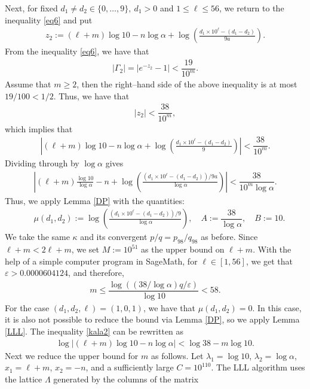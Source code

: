 \documentclass[10pt,a4paper]{article}
\begin{document}
\noindent
Next, for fixed $ d_1\neq d_2\in\{0, \ldots, 9\}, ~d_1>0 $ and $ 1\le \ell\le 56 $, we return to the inequality \eqref{eq6} and put
\begin{align*}
z_2:=(\ell+m)\log 10 - n\log\alpha +\log\left(\frac{d_1\times 10^{\ell}-(d_1-d_2)}{9a}\right).
\end{align*}
From the inequality \eqref{eq6}, we have that
\begin{align*}
|\Gamma_2| = \left|e^{-z_2}-1\right|< \dfrac{19}{10^{m}}.
\end{align*}
Assume that $ m\ge 2 $, then the right--hand side of the above inequality is at most $ 19/100 < 1/2 $. Thus, we have that
\begin{align*}
|z_2|<  \dfrac{38}{10^{m}},
\end{align*}
which implies that
\begin{align}\label{kala2}
\left|(\ell+m)\log 10 - n\log\alpha +\log\left(\frac{d_1\times 10^{\ell}-(d_1-d_2)}{9}\right)\right| <  \dfrac{38}{10^{m}}.
\end{align}
Dividing through by $ \log\alpha $ gives
\begin{align*}
\left|(\ell+m)\frac{\log 10}{\log\alpha} - n +\log\left(\frac{(d_1\times 10^{\ell}-(d_1-d_2))/9a}{\log\alpha}\right)\right| <  \dfrac{38}{10^{m}\log\alpha}.
\end{align*}
Thus, we apply Lemma \ref{DP} with the quantities:
\begin{align*}
 \quad \mu(d_1,d_2):=\log\left(\frac{(d_1\times 10^{\ell}-(d_1-d_2))/9}{\log\alpha}\right), \quad A:=\dfrac{38}{\log\alpha}, \quad B:=10.
\end{align*}
We take the same $ \kappa $ and its convergent $ p/q =p_{98}/q_{98} $ as before. Since $ \ell+m < 2\ell+m $, we set $M :=10^{51} $ as the upper bound on $ \ell+m $. With the help of a simple computer program in SageMath, for $ \ell\in [1,56] $,  we get that $ \varepsilon >0.0000604124 $, and therefore,
\begin{align*}
m\le \dfrac{\log((38/\log\alpha)q/\varepsilon)}{\log 10}<58.
\end{align*}
For the case $ (d_1, d_2, \ell)=(1,0,1) $, we have that $ \mu(d_1,d_2)=0 $. In this case, it is also not possible to reduce the bound via Lemma \ref{DP}, so we apply Lemma \ref{LLL}. The inequality \eqref{kala2} can be rewritten as
\begin{align}\label{kala3}
\log \left|(\ell+m)\log 10 - n\log\alpha \right| <  \log 38 - m\log 10.
\end{align}
Next we reduce the upper bound for $ m $ as follows. Let $ \lambda_1=\log 10 $, $ \lambda_2=\log\alpha $, $ x_1=\ell+m $, $ x_2=-n $, and a sufficiently large $ C= 10^{110} $. The LLL algorithm uses the lattice $ \Lambda $ generated by the columns of the matrix
\end{document}
